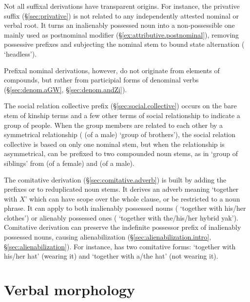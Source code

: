 Not all suffixal derivations have transparent origins. For instance, the privative  suffix (§\ref{sec:privative}) is not related to any independently attested nominal or verbal root. It turns an inalienably possessed noun into a non-possessible one mainly used as postnominal modifier (§\ref{ex:attributive.postnominal}), removing possessive prefixes and subjecting the nominal stem to bound state alternation ( \fl{}  `headless').

Prefixal nominal derivations, however, do not originate from elements of compounds, but rather from participial forms of denominal verbs (§\ref{sec:denom.aGW}, §\ref{sec:denom.andZi}). 

The social relation collective  prefix (§\ref{sec:social.collective}) occurs on the bare stem of kinship terms and a few other terms of social relationship to indicate a group of people. When the group members are  related to each other by a symmetrical relationship ( (of a male) \fl{}  `group of brothers'), the social relation collective is based on only one nominal stem, but when the relationship is asymmetrical,  can be prefixed to two compounded noun stems, as in  `group of siblings' from  (of a female) and  (of a male).
 
The comitative derivation (§\ref{sec:comitative.adverb}) is built by adding the prefixes  or  to reduplicated noun stems. It derives an adverb meaning `together with $X$' which can have scope over the whole clause, or be restricted to a noun phrase. It can apply to both inalienably possessed nouns ( \fl{}  `together with his/her clothes') or alienably possessed ones ( \fl{}  `together with the/his/her hybrid yak'). Comitative derivation can preserve the indefinite possessor prefix of inalienably possessed nouns, causing alienabilization (§\ref{sec:alienabilization.intro}, §\ref{sec:alienabilization}). For instance,  has two comitative forms:  `together with his/her hat' (wearing it)  and  `together with a/the hat' (not wearing it).

\section{Verbal morphology} \label{sec:verb.introduction}

